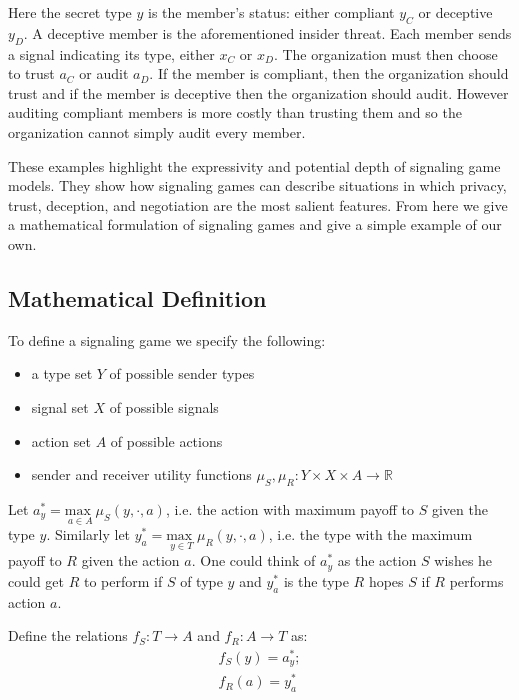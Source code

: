 \documentclass{article}
\begin{document}
Here the secret type $y$ is the member's status: either compliant $y_C$ or deceptive $y_D$. A deceptive member is the aforementioned insider threat. Each member sends a signal indicating its type, either $x_C$ or $x_D$. The organization must then choose to trust $a_C$ or audit $a_D$. If the member is compliant, then the organization should trust and if the member is deceptive then the organization should audit. However auditing compliant members is more costly than trusting them and so the organization cannot simply audit every member.

These examples highlight the expressivity and potential depth of signaling game models. They show how signaling games can describe situations in which privacy, trust, deception, and negotiation are the most salient features. From here we give a mathematical formulation of signaling games and give a simple example of our own.

\subsection{Mathematical Definition}
To define a signaling game we specify the following:
\begin{itemize}
    \item a type set $Y$ of possible sender types
    \item signal set $X$ of possible signals
    \item action set $A$ of possible actions
    \item sender and receiver utility functions $\mu_S, \mu_R: Y \times X \times A \longrightarrow \mathbb{R}$
\end{itemize}

\noindent Let $a_y^* = \underset{a \in A}{\text{max }} \mu_S(y, \cdot, a)$, i.e. the action with maximum payoff to $S$ given the type $y$. Similarly let $y_a^* = \underset{y \in T}{\text{max }} \mu_R(y, \cdot, a)$, i.e. the type with the maximum payoff to $R$ given the action $a$. One could think of $a_y^*$ as the action $S$ wishes he could get $R$ to perform if $S$ of type $y$ and $y_a^*$ is the type $R$ hopes $S$ if $R$ performs action $a$.

Define the relations $f_S: T \rightarrow A$ and $f_R: A \rightarrow T$ as:
\begin{align*}
    f_S(y) = a_y^*;\\
    f_R(a) = y_a^*
\end{align*}
\end{document}
